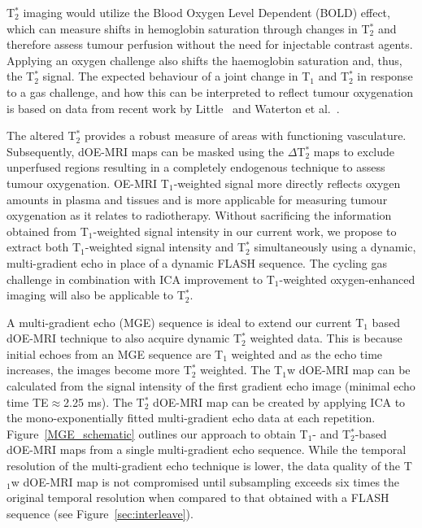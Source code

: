 T$_2^*$ imaging would utilize the Blood Oxygen Level Dependent (\acs{BOLD}) effect, which can measure shifts in hemoglobin saturation through changes in T$_2^*$ and therefore assess tumour perfusion without the need for injectable contrast agents. 
Applying an oxygen challenge also shifts the haemoglobin saturation and, thus, the T$_2^*$ signal. 
The expected behaviour of a joint change in T$_1$ and T$_2^*$ in response to a gas challenge, and how this can be interpreted to reflect tumour oxygenation is based on data from recent work by Little~\cite{Little:2018iu} and Waterton et al.~\cite{OConnor:2019fc}. 

The altered T$_2^*$ provides a robust measure of areas with functioning vasculature. 
Subsequently, \acs{dOE-MRI} maps can be masked using the $\Delta$T$_2^*$ maps to exclude unperfused regions resulting in a completely endogenous technique to assess tumour oxygenation. 
OE-MRI T$_1$-weighted signal more directly reflects oxygen amounts in plasma and tissues and is more applicable for measuring tumour oxygenation as it relates to radiotherapy.
Without sacrificing the information obtained from T$_1$-weighted signal intensity in our current work, we propose to extract both T$_1$-weighted signal intensity and T$_2^*$ simultaneously using a dynamic, multi-gradient echo in place of a dynamic FLASH sequence. 
The cycling gas challenge in combination with \acs{ICA} improvement to T$_1$-weighted oxygen-enhanced imaging will also be applicable to T$_2^*$.

A multi-gradient echo (\acs{MGE}) sequence is ideal to extend our current T$_1$ based dOE-MRI technique to also acquire dynamic T$_2^*$ weighted data.
This is because initial echoes from an \acs{MGE} sequence are T$_1$ weighted and as the echo time increases, the images become more T$_2^*$ weighted. 
The T$_1$w \acs{dOE-MRI} map can be calculated from the signal intensity of the first gradient echo image (minimal echo time TE$\approx$2.25 ms). 
The T$_2^*$ \acs{dOE-MRI} map can be created by applying \acs{ICA} to the mono-exponentially fitted multi-gradient echo data at each repetition. 
Figure~\ref{MGE_schematic} outlines our approach to obtain T$_1$- and T$_2^*$-based \acs{dOE-MRI} maps from a single multi-gradient echo sequence. 
While the temporal resolution of the multi-gradient echo technique is lower, the data quality of the T$_1$w \acs{dOE-MRI} map is not compromised until subsampling exceeds six times the original temporal resolution when compared to that obtained with a \acs{FLASH} sequence (see Figure~\ref{sec:interleave}).

